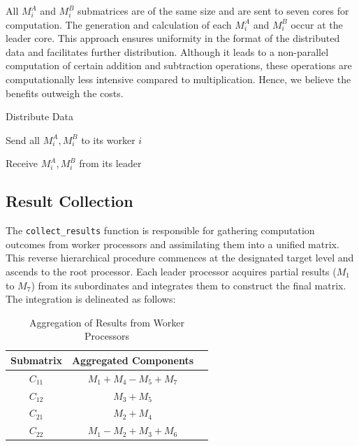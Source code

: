 \documentclass[12pt,a4paper]{article}
\begin{document}
All $M^A_i$ and $M^B_i$ submatrices are of the same size and are sent to seven cores for computation. The generation and calculation of each $M^A_i$ and $M^B_i$ occur at the leader core. 
This approach ensures uniformity in the format of the distributed data and facilitates further distribution. 
Although it leads to a non-parallel computation of certain addition and subtraction operations, 
these operations are computationally less intensive compared to multiplication. Hence, we believe the benefits outweigh the costs.

\begin{algorithm}[htbp]
    \caption{Distribute Data}
    \label{alg:distribute_data}
    \begin{algorithmic}[1]
            \State Send all $M^A_i, M^B_i$ to its worker $i$
        \EndIf
        
            \State Receive $M^A_i, M^B_i$ from its leader
       \EndIf
    \EndProcedure
    \end{algorithmic}
\end{algorithm}


\subsection{Result Collection}
The \texttt{collect\_results} function is responsible for gathering computation outcomes from worker processors and assimilating them into a unified matrix. This reverse hierarchical procedure commences at the designated target level and ascends to the root processor. Each leader processor acquires partial results ($M_1$ to $M_7$) from its subordinates and integrates them to construct the final matrix. The integration is delineated as follows:

\begin{table}[htbp]
\centering
\begin{tabular}{ccl}
\toprule
\textbf{Submatrix} & \textbf{Aggregated Components} \\
\midrule
$C_{11}$ & $M_1 + M_4 - M_5 + M_7$ \\
$C_{12}$ & $M_3 + M_5$ \\
$C_{21}$ & $M_2 + M_4$ \\
$C_{22}$ & $M_1 - M_2 + M_3 + M_6$ \\
\bottomrule
\end{tabular}
\caption{Aggregation of Results from Worker Processors}
\label{tab:aggregation}
\end{table}
\end{document}
